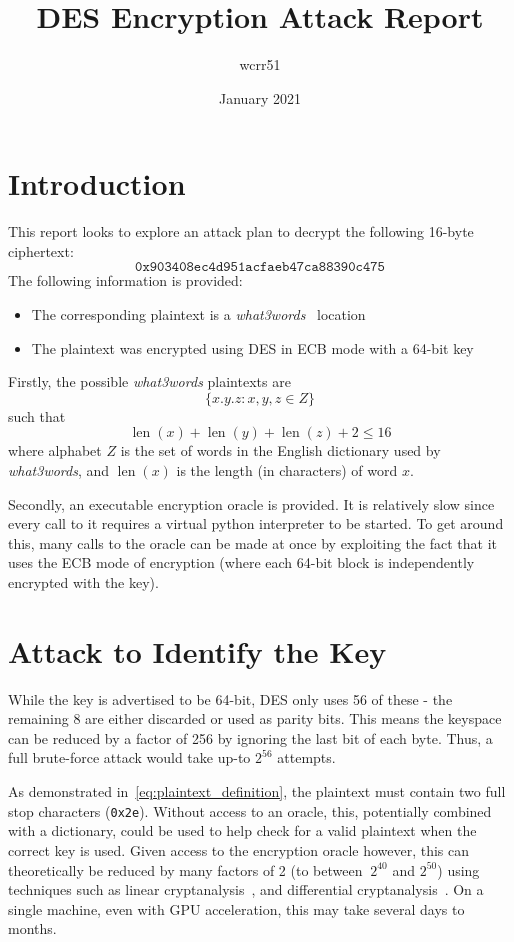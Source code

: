 \documentclass[11pt]{article}
\title{\vspace{-2cm}DES Encryption Attack Report}
\author{wcrr51}
\date{January 2021}
\DeclareMathOperator{\len}{len}
\begin{document}
    \maketitle


    \section{Introduction}\label{sec:introduction}
    This report looks to explore an attack plan to decrypt the following 16-byte ciphertext:
    \[\texttt{0x903408ec4d951acfaeb47ca88390c475} \tag{1}\label{eq:ciphertext}\]
    The following information is provided:
    \begin{itemize}
        \item The corresponding plaintext is a \textit{what3words}~\cite{what3words} location
        \item The plaintext was encrypted using DES in ECB mode with a 64-bit key
    \end{itemize}

    Firstly, the possible \textit{what3words} plaintexts are
    \[\{x.y.z : x, y, z \in Z\}\tag{2}\label{eq:plaintext_definition}\]
    such that
    \[\len(x) + \len(y) + \len(z) + 2 \leq 16 \tag{3}\label{eq:word_constraint}\]
    where alphabet $Z$ is the set of words in the English dictionary used by \textit{what3words}, and $\len(x)$ is the length (in characters) of word $x$.

    Secondly, an executable encryption oracle is provided.
    It is relatively slow since every call to it requires a virtual python interpreter to be started.
    To get around this, many calls to the oracle can be made at once by exploiting the fact that it uses the ECB mode of encryption (where each 64-bit block is independently encrypted with the key).


    \section{Attack to Identify the Key}\label{sec:key-identification-attack}
    While the key is advertised to be 64-bit, DES only uses 56 of these - the remaining 8 are either discarded or used as parity bits.
    This means the keyspace can be reduced by a factor of 256 by ignoring the last bit of each byte.
    Thus, a full brute-force attack would take up-to $2^{56}$ attempts.

    As demonstrated in~\eqref{eq:plaintext_definition}, the plaintext must contain two full stop characters (\texttt{0x2e}).
    Without access to an oracle, this, potentially combined with a dictionary, could be used to help check for a valid plaintext when the correct key is used.
    Given access to the encryption oracle however, this can theoretically be reduced by many factors of 2 (to between $~2^{40}$ and $2^{50}$) using techniques such as linear cryptanalysis~\cite{matsui1993linear}, and differential cryptanalysis~\cite{biham1992differential}.
    On a single machine, even with GPU acceleration, this may take several days to months.
\end{document}
